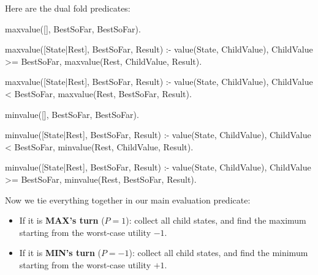 


Here are the dual fold predicates:

\begin{codeblock}
maxvalue([], BestSoFar, BestSoFar).

maxvalue([State|Rest], BestSoFar, Result) :-
    value(State, ChildValue),
    ChildValue >= BestSoFar,
    maxvalue(Rest, ChildValue, Result).

maxvalue([State|Rest], BestSoFar, Result) :-
    value(State, ChildValue),
    ChildValue < BestSoFar,
    maxvalue(Rest, BestSoFar, Result).

minvalue([], BestSoFar, BestSoFar).

minvalue([State|Rest], BestSoFar, Result) :-
    value(State, ChildValue),
    ChildValue < BestSoFar,
    minvalue(Rest, ChildValue, Result).

minvalue([State|Rest], BestSoFar, Result) :-
    value(State, ChildValue),
    ChildValue >= BestSoFar,
    minvalue(Rest, BestSoFar, Result).
\end{codeblock}


Now we tie everything together in our main evaluation predicate:
\begin{itemize}
    \item If it is \textbf{MAX's turn} ($P = 1$): collect all child states, and find the maximum starting from the worst-case utility $-1$.
    \item If it is \textbf{MIN's turn} ($P = -1$): collect all child states, and find the minimum starting from the worst-case utility $+1$.
\end{itemize}

